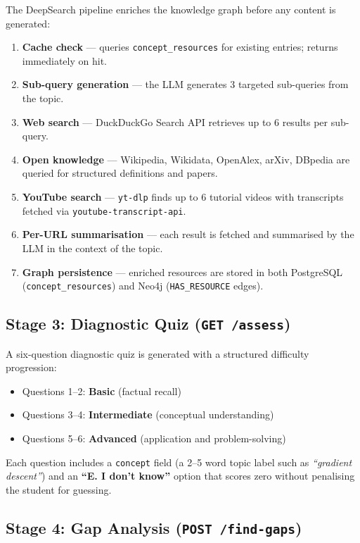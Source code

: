 \documentclass[12pt,a4paper]{article}
\begin{document}
The DeepSearch pipeline enriches the knowledge graph before any content is
generated:

\begin{enumerate}
  \item \textbf{Cache check} — queries \texttt{concept\_resources} for
    existing entries; returns immediately on hit.
  \item \textbf{Sub-query generation} — the LLM generates 3 targeted
    sub-queries from the topic.
  \item \textbf{Web search} — DuckDuckGo Search API retrieves up to 6
    results per sub-query.
  \item \textbf{Open knowledge} — Wikipedia, Wikidata, OpenAlex, arXiv,
    DBpedia are queried for structured definitions and papers.
  \item \textbf{YouTube search} — \texttt{yt-dlp} finds up to 6 tutorial
    videos with transcripts fetched via \texttt{youtube-transcript-api}.
  \item \textbf{Per-URL summarisation} — each result is fetched and
    summarised by the LLM in the context of the topic.
  \item \textbf{Graph persistence} — enriched resources are stored in both
    PostgreSQL (\texttt{concept\_resources}) and Neo4j
    (\texttt{HAS\_RESOURCE} edges).
\end{enumerate}

\subsection{Stage 3: Diagnostic Quiz (\texttt{GET /assess})}

A six-question diagnostic quiz is generated with a structured difficulty
progression:

\begin{itemize}
  \item Questions 1--2: \textbf{Basic} (factual recall)
  \item Questions 3--4: \textbf{Intermediate} (conceptual understanding)
  \item Questions 5--6: \textbf{Advanced} (application and problem-solving)
\end{itemize}

Each question includes a \texttt{concept} field (a 2--5 word topic label
such as \emph{``gradient descent''}) and an \textbf{``E. I don't know''}
option that scores zero without penalising the student for guessing.

\subsection{Stage 4: Gap Analysis (\texttt{POST /find-gaps})}
\end{document}
